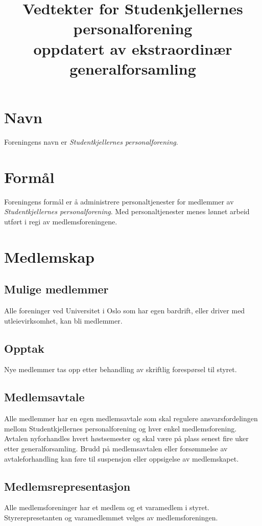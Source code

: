 \documentclass[11pt,norsk,a4paper]{article}
\author{}
\title{%
    {\LARGE\textbf{Vedtekter for Studenkjellernes personalforening}}\\[7pt]
	{\small oppdatert av ekstraordinær generalforsamling \thedate}
}
\date{}
\begin{document}
\maketitle{}

\section{Navn\label{sec:navn}}
Foreningens navn er \emph{Studentkjellernes personalforening}.


\section{Formål\label{sec:formål}}
Foreningens formål er å administrere personaltjenester for medlemmer av 
\emph{Studentkjellernes personalforening}.
Med personaltjenester menes lønnet arbeid utført i regi av medlemsforeningene.


\section{Medlemskap\label{sec:3}}

\subsection{Mulige medlemmer}
Alle foreninger ved Universitet i Oslo som  har egen bardrift, eller driver med utleievirksomhet, kan bli medlemmer.

\subsection{Opptak}
Nye medlemmer tas opp etter behandling av skriftlig forespørsel til styret.

\subsection{Medlemsavtale}
Alle medlemmer har en egen medlemsavtale som skal regulere ansvarsfordelingen
mellom Studentkjellernes personalforening og hver enkel medlemsforening.
Avtalen nyforhandles hvert høstsemester og skal være på plass senest
fire uker etter generalforsamling. 
Brudd på medlemsavtalen eller forsømmelse av avtaleforhandling
kan føre til suspensjon eller oppsigelse av medlemskapet.

\subsection{Medlemsrepresentasjon\label{sec:medlemsrepresentanter}}
Alle medlemsforeninger har et medlem og et varamedlem i styret.
Styrerepresetanten og varamedlemmet velges av medlemsforeningen.
\end{document}
